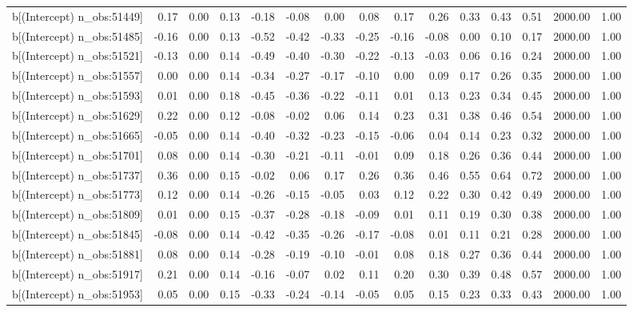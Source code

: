 \begin{table}[ht]
\begin{tabular}{rrrrrrrrrrrrrrr}
  b[(Intercept) n\_obs:51449] & 0.17 & 0.00 & 0.13 & -0.18 & -0.08 & 0.00 & 0.08 & 0.17 & 0.26 & 0.33 & 0.43 & 0.51 & 2000.00 & 1.00 \\ 
  b[(Intercept) n\_obs:51485] & -0.16 & 0.00 & 0.13 & -0.52 & -0.42 & -0.33 & -0.25 & -0.16 & -0.08 & 0.00 & 0.10 & 0.17 & 2000.00 & 1.00 \\ 
  b[(Intercept) n\_obs:51521] & -0.13 & 0.00 & 0.14 & -0.49 & -0.40 & -0.30 & -0.22 & -0.13 & -0.03 & 0.06 & 0.16 & 0.24 & 2000.00 & 1.00 \\ 
  b[(Intercept) n\_obs:51557] & 0.00 & 0.00 & 0.14 & -0.34 & -0.27 & -0.17 & -0.10 & 0.00 & 0.09 & 0.17 & 0.26 & 0.35 & 2000.00 & 1.00 \\ 
  b[(Intercept) n\_obs:51593] & 0.01 & 0.00 & 0.18 & -0.45 & -0.36 & -0.22 & -0.11 & 0.01 & 0.13 & 0.23 & 0.34 & 0.45 & 2000.00 & 1.00 \\ 
  b[(Intercept) n\_obs:51629] & 0.22 & 0.00 & 0.12 & -0.08 & -0.02 & 0.06 & 0.14 & 0.23 & 0.31 & 0.38 & 0.46 & 0.54 & 2000.00 & 1.00 \\ 
  b[(Intercept) n\_obs:51665] & -0.05 & 0.00 & 0.14 & -0.40 & -0.32 & -0.23 & -0.15 & -0.06 & 0.04 & 0.14 & 0.23 & 0.32 & 2000.00 & 1.00 \\ 
  b[(Intercept) n\_obs:51701] & 0.08 & 0.00 & 0.14 & -0.30 & -0.21 & -0.11 & -0.01 & 0.09 & 0.18 & 0.26 & 0.36 & 0.44 & 2000.00 & 1.00 \\ 
  b[(Intercept) n\_obs:51737] & 0.36 & 0.00 & 0.15 & -0.02 & 0.06 & 0.17 & 0.26 & 0.36 & 0.46 & 0.55 & 0.64 & 0.72 & 2000.00 & 1.00 \\ 
  b[(Intercept) n\_obs:51773] & 0.12 & 0.00 & 0.14 & -0.26 & -0.15 & -0.05 & 0.03 & 0.12 & 0.22 & 0.30 & 0.42 & 0.49 & 2000.00 & 1.00 \\ 
  b[(Intercept) n\_obs:51809] & 0.01 & 0.00 & 0.15 & -0.37 & -0.28 & -0.18 & -0.09 & 0.01 & 0.11 & 0.19 & 0.30 & 0.38 & 2000.00 & 1.00 \\ 
  b[(Intercept) n\_obs:51845] & -0.08 & 0.00 & 0.14 & -0.42 & -0.35 & -0.26 & -0.17 & -0.08 & 0.01 & 0.11 & 0.21 & 0.28 & 2000.00 & 1.00 \\ 
  b[(Intercept) n\_obs:51881] & 0.08 & 0.00 & 0.14 & -0.28 & -0.19 & -0.10 & -0.01 & 0.08 & 0.18 & 0.27 & 0.36 & 0.44 & 2000.00 & 1.00 \\ 
  b[(Intercept) n\_obs:51917] & 0.21 & 0.00 & 0.14 & -0.16 & -0.07 & 0.02 & 0.11 & 0.20 & 0.30 & 0.39 & 0.48 & 0.57 & 2000.00 & 1.00 \\ 
  b[(Intercept) n\_obs:51953] & 0.05 & 0.00 & 0.15 & -0.33 & -0.24 & -0.14 & -0.05 & 0.05 & 0.15 & 0.23 & 0.33 & 0.43 & 2000.00 & 1.00 \\ 

\end{tabular}
\end{table}

